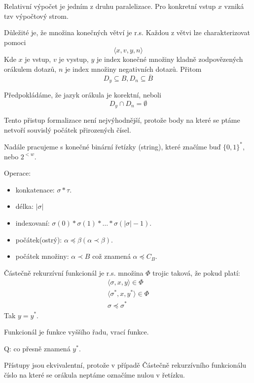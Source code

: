\begin{note}
	Relativní výpočet je jedním z druhu paralelizace.
	Pro konkretní vstup $x$ vzniká tzv výpočtový strom.

	Důležité je, že množina konečných větví je r.s.
	Každou z větvi lze charakterizovat pomoci
	\[ \langle x, v, y, n \rangle \]
	Kde $x$ je vstup, $v$ je vystup, $y$ je index konečné množiny kladně zodpovězených orákulem dotazů, $n$ je index množiny negativních dotazů.
	Přitom
	\[ D_y \subseteq B, D_n \subseteq \overline{B} \]

	Předpokládáme, že jazyk orákula je korektní, neboli
	\[ D_y \cap D_n = \emptyset \]

	Tento přistup formalizace není nejvýhodnější, protože body na které se ptáme netvoří souvislý počátek přirozených čísel.
\end{note}

\begin{agreement}[Strings]
	Nadále pracujeme s konečné binární řetízky (string), které značíme buď $\{ 0, 1 \}^{\ast}$, nebo $2^{<w}$.

	Operace:
	\begin{itemize}
		\item konkatenace: $\sigma * \tau$.
		\item délka: $|\sigma|$
		\item indexovaní: $\sigma(0) * \sigma(1) * \ldots * \sigma(|\sigma| - 1)$.
		\item počátek(ostrý): $\alpha \preccurlyeq \beta (\alpha \prec \beta)$.
		\item počátek množiny: $\alpha \prec B$ což znamená $\alpha \preccurlyeq C_B$.
	\end{itemize}
\end{agreement}

\begin{definition}
	Částečně rekurzívní funkcionál je r.s. množina $\Phi$ trojic taková, že pokud platí:
	\begin{gather*}
		\langle \sigma, x, y \rangle \in \Phi \\
		\langle \sigma^{\ast}, x, y^{\ast} \rangle \in \Phi \\
		\sigma \preccurlyeq \sigma^{\ast}
	\end{gather*}
	Tak $y = y^{\ast}$.

	Funkcionál je funkce vyššího řadu, vrací funkce.
\end{definition}
Q: co přesně znamená $y^{\ast}$.

\begin{note}
	Přístupy jsou ekvivalentní, protože v případě Částečně rekurzívního funkcionálu číslo na které se orákula neptáme označíme nulou v řetízku.
\end{note}

